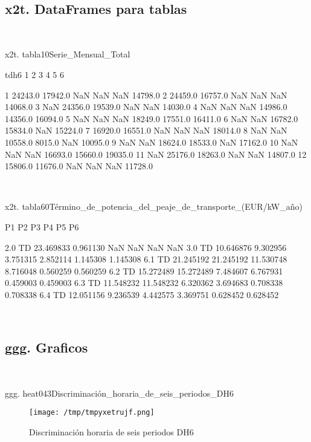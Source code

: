 \documentclass[a4paper,10pt]{article}
\begin{document}
\begin{Form}
\
\newpage 
\subsection{x2t. DataFrames para tablas}\

x2t. tabla10Serie_Mensual_Total

tdh6        1        2        3        4        5        6
                                                          
1     24243.0  17942.0      NaN      NaN      NaN  14798.0
2     24459.0  16757.0      NaN      NaN      NaN  14068.0
3         NaN  24356.0  19539.0      NaN      NaN  14030.0
4         NaN      NaN      NaN  14986.0  14356.0  16094.0
5         NaN      NaN      NaN  18249.0  17551.0  16411.0
6         NaN      NaN  16782.0  15834.0      NaN  15224.0
7     16920.0  16551.0      NaN      NaN      NaN  18014.0
8         NaN      NaN  10558.0   8015.0      NaN  10095.0
9         NaN      NaN  18624.0  18533.0      NaN  17162.0
10        NaN      NaN      NaN  16693.0  15660.0  19035.0
11        NaN  25176.0  18263.0      NaN      NaN  14807.0
12    15806.0  11676.0      NaN      NaN      NaN  11728.0 \

\

x2t. tabla60Término_de_potencia_del_peaje_de_transporte_(EUR/kW_año)

               P1         P2         P3        P4        P5        P6
                                                                     
2.0 TD  23.469833   0.961130        NaN       NaN       NaN       NaN
3.0 TD  10.646876   9.302956   3.751315  2.852114  1.145308  1.145308
6.1 TD  21.245192  21.245192  11.530748  8.716048  0.560259  0.560259
6.2 TD  15.272489  15.272489   7.484607  6.767931  0.459003  0.459003
6.3 TD  11.548232  11.548232   6.320362  3.694683  0.708338  0.708338
6.4 TD  12.051156   9.236539   4.442575  3.369751  0.628452  0.628452 \

\
\newpage 
\subsection{ggg. Graficos}\

ggg. heat043Discriminación_horaria_de_seis_periodos_DH6

\begin{figure}[H] \centering
                    
                    \texttt{[image: /tmp/tmpyxetrujf.png]}
                    \caption{Discriminación horaria de seis periodos DH6}
                    

\end{figure}
\end{Form}
\end{document}
